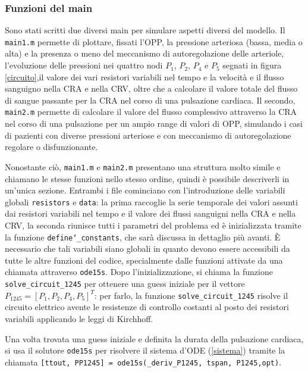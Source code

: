 \documentclass{article}
\begin{document}
\subsubsection*{Funzioni del main}
Sono stati scritti due diversi main per simulare aspetti diversi del modello.
Il \texttt{main1.m} permette di plottare, fissati l'OPP, la pressione arteriosa (bassa, media o alta) e la presenza o meno del meccanismo di autoregolazione delle arteriole, l'evoluzione delle pressioni nei quattro nodi $P_1$, $P_2$, $P_4$ e $P_5$ segnati in figura \ref{circuito},il valore dei vari resistori variabili nel tempo e la velocità e il flusso sanguigno nella CRA e nella CRV, oltre che a calcolare il valore totale del flusso di sangue passante per la CRA nel corso di una pulsazione cardiaca.
Il secondo, \texttt{main2.m} permette di calcolare il valore del flusso complessivo attraverso la CRA nel corso di una pulsazione per un ampio range di valori di OPP, simulando i casi di pazienti con diverse pressioni arteriose e con meccanismo di autoregolazione regolare o disfunzionante.

Nonostante ciò, \texttt{main1.m} e \texttt{main2.m} presentano una struttura molto simile e chiamano le stesse funzioni nello stesso ordine, quindi è possibile descriverli in un'unica sezione.
Entrambi i file cominciano con l'introduzione delle variabili globali \texttt{resistors} e \texttt{data}: la prima raccoglie la serie temporale dei valori assunti dai resistori variabili nel tempo e il valore dei flussi sanguigni nella CRA e nella CRV, la seconda riunisce tutti i parametri del problema ed è inizializzata tramite la funzione \texttt{define\char`_constants}, che sarà discussa in dettaglio più avanti.
È necessario che tali variabili siano globali in quanto devono essere accessibili da tutte le altre funzioni del codice, specialmente dalle funzioni attivate da una chiamata attraverso \texttt{ode15s}.
Dopo l'inizializzazione, si chiama la funzione \texttt{solve\_circuit\_1245} per ottenere una guess iniziale per il vettore $P_{1245} = [P_1, P_2, P_4, P_5]^T$: per farlo, la funzione \texttt{solve\_circuit\_1245} risolve il circuito elettrico avente le resistenze di controllo costanti al posto dei resistori variabili applicando le leggi di Kirchhoff.

Una volta trovata una guess iniziale e definita la durata della pulsazione cardiaca, si usa il solutore \texttt{ode15s} per risolvere il sistema d'ODE (\ref{sistema}) tramite la chiamata \texttt{[ttout, PP1245] = ode15s(\@time\_deriv\_P1245, tspan, P1245,opt)}.
\end{document}
